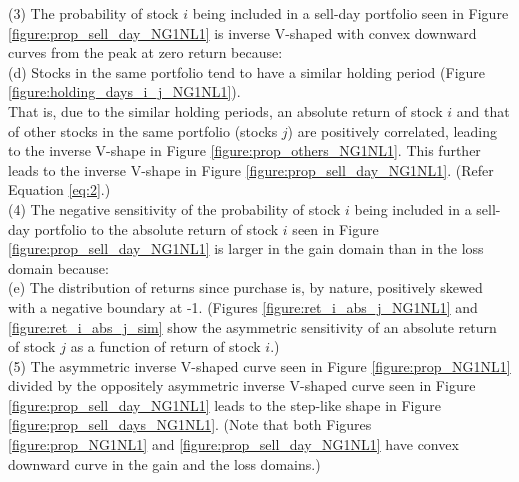 \documentclass[11pt, a4paper]{article}
\begin{document}
\noindent
(3) The probability of stock $i$ being included in a sell-day portfolio seen in Figure \ref{figure:prop_sell_day_NG1NL1} is inverse V-shaped with convex downward curves from the peak at zero return because:\\
\noindent
(d) Stocks in the same portfolio tend to have a similar holding period (Figure \ref{figure:holding_days_i_j_NG1NL1}).\\
That is, due to the similar holding periods, an absolute return of stock $i$ and that of other stocks in the same portfolio (stocks $j$) are positively correlated, leading to the inverse V-shape in Figure \ref{figure:prop_others_NG1NL1}. This further leads to the inverse V-shape in Figure \ref{figure:prop_sell_day_NG1NL1}. (Refer Equation \ref{eq:2}.)\\

\noindent
(4) The negative sensitivity of the probability of stock $i$ being included in a sell-day portfolio to the absolute return of stock $i$ seen in Figure \ref{figure:prop_sell_day_NG1NL1} is larger in the gain domain than in the loss domain because:\\
\noindent
(e) The distribution of returns since purchase is, by nature, positively skewed with a negative boundary at -1. (Figures \ref{figure:ret_i_abs_j_NG1NL1} and \ref{figure:ret_i_abs_j_sim} show the asymmetric sensitivity of an absolute return of stock $j$ as a function of return of stock $i$.)\\

\noindent
(5) The asymmetric inverse V-shaped curve seen in Figure \ref{figure:prop_NG1NL1} divided by the oppositely asymmetric inverse V-shaped curve seen in Figure \ref{figure:prop_sell_day_NG1NL1} leads to the step-like shape in Figure \ref{figure:prop_sell_days_NG1NL1}. (Note that both Figures  \ref{figure:prop_NG1NL1} and \ref{figure:prop_sell_day_NG1NL1} have convex downward curve in the gain and the loss domains.)\\

\end{document}
